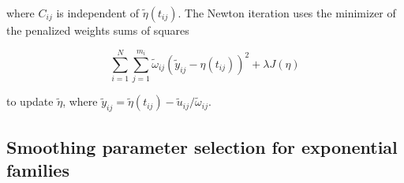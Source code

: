 \noindent
where $C_{ij}$ is independent of $\tilde{\eta}\left(t_{ij}\right)$.  The Newton iteration uses the minimizer of the penalized weights sums of squares

\begin{equation} \label{eq:penalized-weighted-sums-of-squares}
\sum_{i=1}^N\sum_{j=1}^{m_i} \tilde{\omega}_{ij}\left(\tilde{y}_{ij} - \eta\left(t_{ij}\right)  \right)^2 + \lambda J\left(\eta\right)
\end{equation}

\noindent
to update $\tilde{\eta}$, where $\tilde{y}_{ij} = \tilde{\eta}\left(t_{ij}\right) - \tilde{u}_{ij}/\tilde{\omega}_{ij}$.


\subsection{Smoothing parameter selection for exponential families}

%


